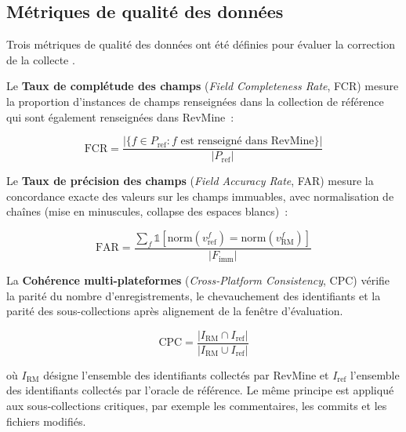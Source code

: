 \subsection{Métriques de qualité des données}

Trois métriques de qualité des données ont été définies pour évaluer la correction de la collecte
\parencite{batini2009methodologies, kalliamvakou2014promises}.

Le \textbf{Taux de complétude des champs} (\textit{Field Completeness Rate}, FCR) mesure la
proportion d'instances de champs renseignées dans la collection de référence qui sont également
renseignées dans RevMine~:

\begin{equation}
\mathrm{FCR} =
\frac{|\{f \in P_{\mathrm{ref}} : f \text{ est renseigné dans RevMine}\}|}
     {|P_{\mathrm{ref}}|}
\end{equation}

Le \textbf{Taux de précision des champs} (\textit{Field Accuracy Rate}, FAR) mesure la
concordance exacte des valeurs sur les champs immuables, avec normalisation de chaînes (mise en
minuscules, collapse des espaces blancs)~:

\begin{equation}
\mathrm{FAR} =
\frac{\sum_{f}\mathbb{1}[\mathrm{norm}(v^{f}_{\mathrm{ref}})
         = \mathrm{norm}(v^{f}_{\mathrm{RM}})]}{|F_{\mathrm{imm}}|}
\end{equation}

La \textbf{Cohérence multi-plateformes} (\textit{Cross-Platform Consistency}, CPC) vérifie la
parité du nombre d'enregistrements, le chevauchement des identifiants et la parité des
sous-collections après alignement de la fenêtre d'évaluation.

\begin{equation}
\mathrm{CPC} =
\frac{|I_{\mathrm{RM}} \cap I_{\mathrm{ref}}|}
     {|I_{\mathrm{RM}} \cup I_{\mathrm{ref}}|}
\end{equation}

où $I_{\mathrm{RM}}$ désigne l'ensemble des identifiants collectés par RevMine et
$I_{\mathrm{ref}}$ l'ensemble des identifiants collectés par l'oracle de référence. Le même
principe est appliqué aux sous-collections critiques, par exemple les commentaires, les commits
et les fichiers modifiés.

